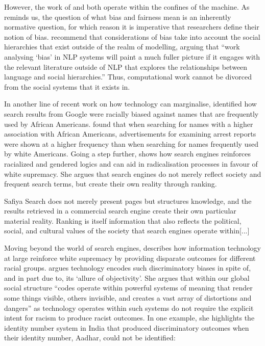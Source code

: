 However, the work of \citet{Kearns:2018} and \citet{Foulds:2019} both operate within the confines of the machine. As \citet{Blodgett:2020} reminds us, the question of what bias and fairness mean is an inherently normative question, for which reason it is imperative that researchers define their notion of bias.
\citet{Blodgett:2020} recommend that considerations of bias take into account the social hierarchies that exist outside of the realm of modelling, arguing that ``work analysing `bias' in NLP systems will paint a much fuller picture if it engages with the relevant literature outside of NLP that explores the relationships between language and social hierarchies.''
Thus, computational work cannot be divorced from the social systems that it exists in.

In another line of recent work on how technology can marginalise, \citet{Sweeney:2013} identified how search results from Google were racially biased against names that are frequently used by African Americans.
\citet{Sweeney:2013} found that when searching for names with a higher association with African Americans, advertisements for examining arrest reports were shown at a higher frequency than when searching for names frequently used by white Americans.
Going a step further, \citet{Noble:2018} shows how search engines reinforces racialized and gendered logics and can aid in radicalisation processes in favour of white supremacy.
She argues that search engines do not merely reflect society and frequent search terms, but create their own reality through ranking.

\begin{citequote}{Safiya \citet[p.148]{Noble:2018}}
  Search does not merely present pages but structures knowledge, and the results retrieved in a commercial search engine create their own particular material reality. Ranking is itself information that also reflects the political, social, and cultural values of the society that search engines operate within[...]
\end{citequote}

Moving beyond the world of search engines, \citet{Benjamin:2019} describes how information technology at large reinforce white supremacy by providing disparate outcomes for different racial groups.
\citet{Benjamin:2019} argues technology encodes such discriminatory biases in spite of, and in part due to, its `allure of objectivity'.
She argues that within our global social structure ``codes operate within powerful systems of meaning that render some things visible, others invisible, and creates a vast array of distortions and dangers'' as technology operates within such systems do not require the explicit intent for racism to produce racist outcomes.
In one example, she highlights the identity number system in India that produced discriminatory outcomes when their identity number, Aadhar, could not be identified:

